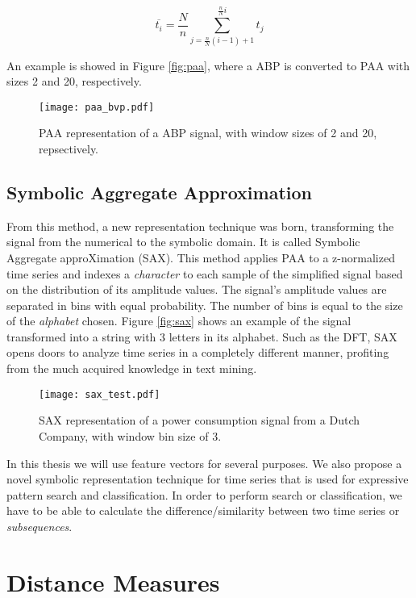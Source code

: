 \begin{equation}
\overline{t_i} = \frac{N}{n} \sum^{\frac{n}{N}i}_{j=\frac{n}{N}(i-1)+1} t_j
\end{equation}

An example is showed in Figure \ref{fig:paa}, where a \gls{ABP} is converted to \gls{PAA} with sizes 2 and 20, respectively.

    
\begin{figure}[!h]
\centering
\texttt{[image: paa\_bvp.pdf]}
\label{fig:paa_intro}
\caption{PAA representation of a \gls{ABP} signal, with window sizes of 2 and 20, repsectively.}
\end{figure}
    

\subsection{Symbolic Aggregate Approximation}
\label{subsec:sax}

From this method, a new representation technique was born, transforming the signal from the numerical to the symbolic domain. It is called Symbolic Aggregate approXimation (SAX). This method applies PAA to a z-normalized time series and indexes a \textit{character} to each sample of the simplified signal based on the distribution of its amplitude values. The signal's amplitude values are separated in bins with equal probability. The number of bins is equal to the size of the \textit{alphabet} chosen. Figure \ref{fig:sax} shows an example of the signal transformed into a string with 3 letters in its alphabet. Such as the DFT, SAX opens doors to analyze time series in a completely different manner, profiting from the much acquired knowledge in text mining.

\begin{figure}
\centering
\texttt{[image: sax\_test.pdf]}
\label{fig:paa_intro}
\caption{SAX representation of a power consumption signal from a Dutch Company, with window bin size of 3.}
\end{figure}

In this thesis we will use feature vectors for several purposes. We also propose a novel symbolic representation technique for time series that is used for expressive pattern search and classification. In order to perform search or classification, we have to be able to calculate the difference/similarity between two time series or \textit{subsequences}.

\section{Distance Measures}
\label{sec:distance}

